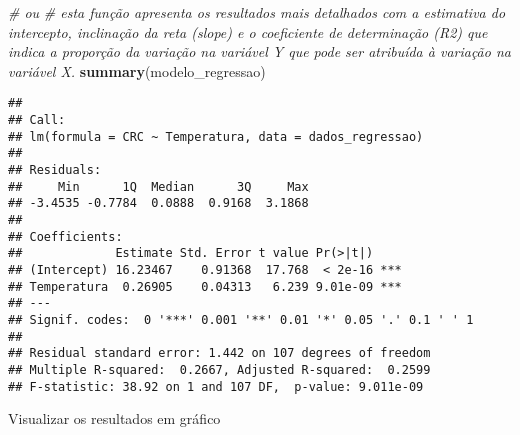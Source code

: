 \documentclass[
]{book}
\newenvironment{Shaded}{\begin{snugshade}}{\end{snugshade}}
\newcommand{\CommentTok}[1]{\textcolor[rgb]{0.56,0.35,0.01}{\textit{#1}}}
\newcommand{\KeywordTok}[1]{\textcolor[rgb]{0.13,0.29,0.53}{\textbf{#1}}}
\newcommand{\NormalTok}[1]{#1}
\begin{document}
\begin{Shaded}
\begin{Highlighting}[]
\CommentTok{# ou}
\CommentTok{# esta função apresenta os resultados mais detalhados com a estimativa do intercepto, inclinação da reta (slope) e o coeficiente de determinação (R2) que indica a proporção da variação na variável Y que pode ser atribuída à variação na variável X.}
\KeywordTok{summary}\NormalTok{(modelo_regressao)}
\end{Highlighting}
\end{Shaded}

\begin{verbatim}
## 
## Call:
## lm(formula = CRC ~ Temperatura, data = dados_regressao)
## 
## Residuals:
##     Min      1Q  Median      3Q     Max 
## -3.4535 -0.7784  0.0888  0.9168  3.1868 
## 
## Coefficients:
##             Estimate Std. Error t value Pr(>|t|)    
## (Intercept) 16.23467    0.91368  17.768  < 2e-16 ***
## Temperatura  0.26905    0.04313   6.239 9.01e-09 ***
## ---
## Signif. codes:  0 '***' 0.001 '**' 0.01 '*' 0.05 '.' 0.1 ' ' 1
## 
## Residual standard error: 1.442 on 107 degrees of freedom
## Multiple R-squared:  0.2667,	Adjusted R-squared:  0.2599 
## F-statistic: 38.92 on 1 and 107 DF,  p-value: 9.011e-09
\end{verbatim}

Visualizar os resultados em gráfico
\end{document}
